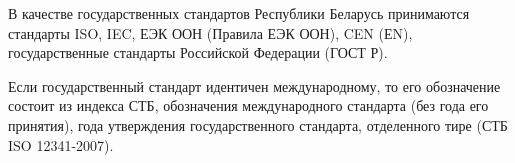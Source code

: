 В качестве государственных стандартов Республики Беларусь принимаются стандарты ISO, IEC, ЕЭК ООН
(Правила ЕЭК ООН), CEN (ЕN), государственные стандарты Российской Федерации (ГОСТ Р).

Если государственный стандарт идентичен международному,
то его обозначение состоит из индекса СТБ,
обозначения международного стандарта (без года его принятия),
года утверждения государственного стандарта, отделенного тире (СТБ ISO 12341-2007).
